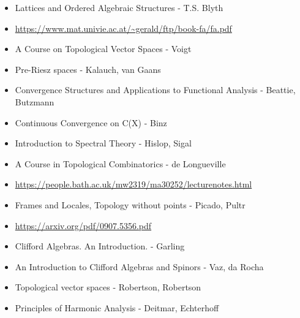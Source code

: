 \documentclass{report}
\begin{document}
\begin{itemize}
\item Lattices and Ordered Algebraic Structures - T.S. Blyth
\item \url{https://www.mat.univie.ac.at/~gerald/ftp/book-fa/fa.pdf}
\item A Course on Topological Vector Spaces - Voigt
\item Pre-Riesz spaces - Kalauch, van Gaans
\item Convergence Structures and Applications to Functional Analysis - Beattie, Butzmann
\item Continuous Convergence on C(X) - Binz
\item Introduction to Spectral Theory - Hislop, Sigal
\item A Course in Topological Combinatorics - de Longueville
\item \url{https://people.bath.ac.uk/mw2319/ma30252/lecturenotes.html}
\item Frames and Locales, Topology without points - Picado, Pultr
\item \url{https://arxiv.org/pdf/0907.5356.pdf}
\item Clifford Algebras. An Introduction. - Garling
\item An Introduction to Clifford Algebras and Spinors - Vaz, da Rocha
\item Topological vector spaces - Robertson, Robertson
\item Principles of Harmonic Analysis - Deitmar, Echterhoff
\end{itemize}
\end{document}
